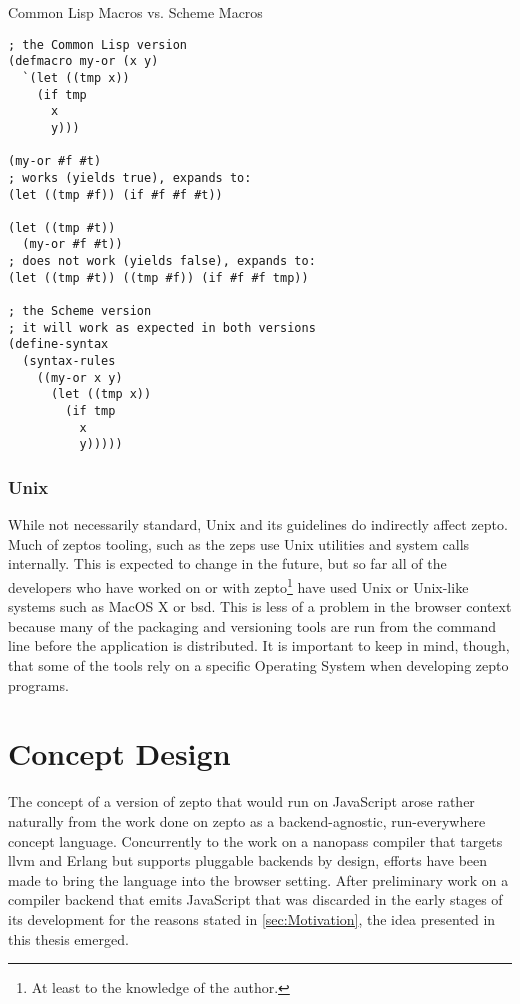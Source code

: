 \documentclass[oneside,11pt,xetex]{scrbook}
\begin{document}
\begin{listing}[H]
\caption{Common Lisp Macros vs. Scheme Macros}
\begin{verbatim}
; the Common Lisp version
(defmacro my-or (x y)
  `(let ((tmp x))
    (if tmp
      x
      y)))

(my-or #f #t)
; works (yields true), expands to:
(let ((tmp #f)) (if #f #f #t))

(let ((tmp #t))
  (my-or #f #t))
; does not work (yields false), expands to:
(let ((tmp #t)) ((tmp #f)) (if #f #f tmp))

; the Scheme version
; it will work as expected in both versions
(define-syntax
  (syntax-rules
    ((my-or x y)
      (let ((tmp x))
        (if tmp
          x
          y)))))
\end{verbatim}
\end{listing}

\subsection{Unix}

While not necessarily standard, Unix and its guidelines do indirectly affect zepto. Much of zeptos
tooling, such as the \gls{zeps} use Unix utilities and system calls internally. This is expected to change
in the future, but so far all of the developers who have worked on or with zepto\footnote{At least to the knowledge
of the author.} have used Unix or Unix-like systems such as MacOS X or \gls{bsd}. This is less of a problem in the
browser context because many of the packaging and versioning tools are run from the command line before the application
is distributed. It is important to keep in mind, though, that some of the tools rely on a specific Operating System when
developing zepto programs.

\chapter{Concept Design}
\label{chap:ConceptDesign}

The concept of a version of zepto that would run on JavaScript arose rather
naturally from the work done on zepto as a backend-agnostic, run-everywhere
concept language. Concurrently to the work on a nanopass compiler that
targets \gls{llvm} and Erlang but supports pluggable backends by design, efforts
have been made to bring the language into the browser setting. After preliminary
work on a compiler backend that emits JavaScript that was discarded in the
early stages of its development for the reasons stated in \ref{sec:Motivation},
the idea presented in this thesis emerged.
\end{document}

